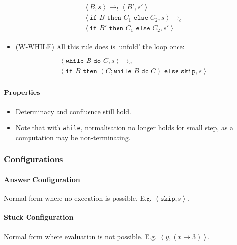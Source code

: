 \documentclass[twocolumn,english]{article}
\begin{document}
\begin{itemize}
\begin{multline*}
\begin{array}{c}
\left\langle B,s\right\rangle \rightarrow_{b}\left\langle B',s'\right\rangle \\
\hline \left\langle \texttt{if }B\texttt{ then }C_{1}\texttt{ else }C_{2},s\right\rangle \rightarrow_{c}\\
\left\langle \texttt{if }B'\texttt{ then }C_{1}\texttt{ else }C_{2},s'\right\rangle 
\end{array}
\end{multline*}
\item {\scriptsize{}(W-WHILE)} All this rule does is `unfold' the loop once:
\begin{multline*}
\begin{array}{c}
\\
\hline \left\langle \texttt{while }B\texttt{ do }C,s\right\rangle \rightarrow_{c}\\
\left\langle \texttt{if }B\texttt{ then }(C;\texttt{while }B\texttt{ do }C)\texttt{ else skip},s\right\rangle 
\end{array}
\end{multline*}
\end{itemize}

\paragraph{Properties}
\begin{itemize}
\item Determinacy and confluence still hold.
\item Note that with \texttt{while}, normalisation no longer holds for small
step, as a computation may be non-terminating.
\end{itemize}

\subsubsection{Configurations}

\paragraph{Answer Configuration}

Normal form where no execution is possible. E.g. $\left\langle \texttt{skip},s\right\rangle $.

\paragraph{Stuck Configuration}

Normal form where evaluation is not possible. E.g. $\left\langle y,(x\mapsto3)\right\rangle $.
\end{document}
